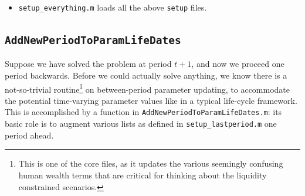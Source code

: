 \documentclass[titlepage,abstract]{\econtex}
\providecommand{\kappaMin}{\kappa\text{Min}}
\providecommand{\vSum}{\vFunc\text{Sum}}
\providecommand{\vFuncOpt}{\vFunc\text{Opt}}
\providecommand{\vFuncPes}{\vFunc\text{Pes}}
\providecommand{\vEndFuncOpt}{\vEndFunc\text{Opt}}
\providecommand{\cFuncOpt}{\cFunc\text{Opt}}
\providecommand{\cFuncPes}{\cFunc\text{Pes}}
\providecommand{\cEndFuncOpt}{\cEndFunc\text{Opt}}
\providecommand{\kappaOpt}{\kappa\text{Opt}}
\providecommand{\hEndExpLife}{\mathfrak{h}\text{ExpLife}}
\providecommand{\hEndMinLife}{\mathfrak{h}\text{MinLife}}
\providecommand{\uP}{u\text{P}}
\providecommand{\uPP}{u\text{PP}}
\begin{document}
\begin{itemize}
\begin{equation}
\begin{gathered}
\begin{aligned}
          \cFuncPes_{t}(m)      &=& =  =  =  =  =  \kappaMin (m+\hEndMinLife_{t}) \\
          \kappaOpt_{t}(m)      &=& =  =  =  =  =  \kappaMin_{t} \\
          \cEndFuncOpt_{t}(a)      &=& =  =  =  =  =  \cFuncOpt_{t}(a+\hEndExpLife_{t})/(1-\kappaMin_{t}) \\
          \cEndFuncOpt_{t}'(a)      &=& =  =  =  =  =  \kappaMin_{t}/(1-\kappaMin_{t})
          \end{aligned}\end{gathered}\end{equation}
          and value function:
          \begin{equation}\begin{gathered}\begin{aligned}
          \vFuncOpt_{t} (m)      &=& =  =  =  =  =  u(\cFuncOpt_{t} (m)) \vSum_{t} \\
          \vFuncPes_{t} (m)      &=& =  =  =  =  =  u(\cFuncPes_{t} (m)) \vSum_{t} \\
          \vFuncOpt_{t}'(m)      &=& =  =  =  =  =  \uP(\cFuncOpt_{t} (m))\kappaMin_{t} \vSum_{t} \\
          \vFuncOpt_{t}''(m)      &=& =  =  =  =  =  \uPP(\cFuncOpt_{t} (m))(\kappaMin_{t})^{2} \vSum_{t} \\
          \vEndFuncOpt_{t}(a)      &=& =  =  =  =  =  u(\cEndFuncOpt_{t} (a)) (\vSum_{t}-1) \\
          \vEndFuncOpt_{t}'(a)      &=& =  =  =  =  =  \uP(\cEndFuncOpt_{t} (a))\cEndFuncOpt_{t}'(a) (\vSum_{t}-1) \\
          \vEndFuncOpt_{t}''(a)      &=& =  =  =  =  =  \uPP(\cEndFuncOpt_{t} (a))(\cEndFuncOpt_{t}'(a))^{2} (\vSum_{t}-1)
          \end{aligned}\end{gathered}\end{equation}
      \item \texttt{setup\_everything.m} loads all the above \texttt{setup} files.
\end{itemize}

\subsection{\texttt{AddNewPeriodToParamLifeDates}}

Suppose we have solved the problem at period $t+1$, and now we proceed one period backwards. Before we could actually solve anything, we know there is a not-so-trivial routine\footnote{This is one of the core files, as it updates the various seemingly confusing human wealth terms that are critical for thinking about the liquidity constrained scenarios.} on between-period parameter updating, to accommodate the potential time-varying parameter values like in a typical life-cycle framework. This is accomplished by a function in \texttt{AddNewPeriodToParamLifeDates.m}: its basic role is to augment various lists as defined in \texttt{setup\_lastperiod.m} one period ahead.
\end{document}
